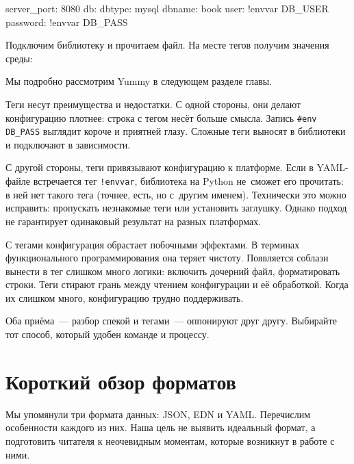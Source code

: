\begin{english}
  \begin{yaml}
server_port: 8080
db:
  dbtype:   mysql
  dbname:   book
  user:     !envvar DB_USER
  password: !envvar DB_PASS
  \end{yaml}
\end{english}

Подключим библиотеку и прочитаем файл. На месте тегов получим значения среды:

\begin{english}
  \begin{clojure}
(require '[yummy.config :as yummy])
(yummy/load-config {:path "config.yaml"})

{:server_port 8080
 :db {:dbtype "mysql"
      :dbname "book"
      :user "ivan"
      :password "*(&fd}A53z#$!"}}
  \end{clojure}
\end{english}

\noindent
Мы подробно рассмотрим Yummy в следующем разделе главы.

Теги несут преимущества и недостатки. С одной стороны, они делают конфигурацию
плотнее: строка с тегом несёт больше смысла. Запись \verb|#env DB_PASS| выглядит
короче и приятней глазу. Сложные теги выносят в библиотеки и подключают в
зависимости.

С другой стороны, теги привязывают конфигурацию к платформе. Если в YAML-файле
встречается тег \verb|!envvar|, библиотека на Python не~сможет его прочитать: в
ней нет такого тега (точнее, есть, но с~другим именем). Технически это можно
исправить: пропускать незнакомые теги или установить заглушку. Однако подход не
гарантирует одинаковый результат на разных платформах.

С тегами конфигурация обрастает побочными эффектами. В терминах функционального
программирования она теряет чистоту. Появляется соблазн вынести в тег слишком
много логики: включить дочерний файл, форматировать строки. Теги стирают грань
между чтением конфигурации и её обработкой. Когда их слишком много, конфигурацию
трудно поддерживать.

Оба приёма~--- разбор спекой и тегами~--- оппонируют друг другу. Выбирайте тот
способ, который удобен команде и процессу.

\section{Короткий обзор форматов}

Мы упомянули три формата данных: JSON, EDN и YAML. Перечислим особенности
каждого из них. Наша цель не выявить идеальный формат, а подготовить читателя к
неочевидным моментам, которые возникнут в работе с ними.

